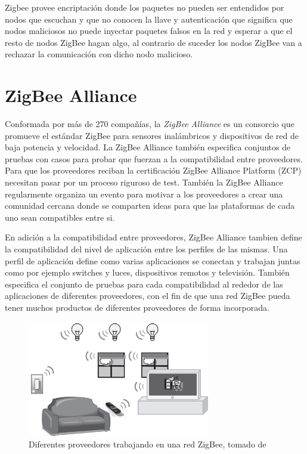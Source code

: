 \documentclass[10pt,journal,compsoc]{IEEEtran}
\begin{document}
Zigbee provee encriptación donde los paquetes no pueden ser entendidos por nodos que escuchan y que no conocen la llave y autenticación que significa que nodos maliciosos no puede inyectar paquetes falsos en la red y esperar a que el resto de nodos ZigBee hagan algo, al contrario de suceder los nodos ZigBee van a rechazar la comunicación con dicho nodo malicioso.

\section{ZigBee Alliance}
 
  Conformada por más de 270 compañías, la \emph{ZigBee Alliance} es un consorcio que promueve el estándar ZigBee para sensores inalámbricos y dispositivos de red de baja potencia y velocidad. La ZigBee Alliance también especifica conjuntos de pruebas con casos para probar que fuerzan a la compatibilidad entre proveedores. Para que los proveedores reciban la certificación ZigBee Alliance Platform (ZCP) necesitan pasar por un proceso riguroso de test. También la ZigBee Alliance regularmente organiza un evento para motivar a los proveedores a crear una comunidad cercana donde se comparten ideas para que las plataformas de cada uno sean compatibles entre si.
  
  En adición a la compatibilidad entre proveedores, ZigBee Alliance tambien define la compatibilidad del nivel de aplicación entre los perfiles de las mismas. Una perfil de aplicación define como varias aplicaciones se conectan y trabajan juntas como por ejemplo switches y luces, dispositivos remotos y televisión. También especifica el conjunto de pruebas para cada compatibilidad al rededor de las aplicaciones de diferentes proveedores, con el fin de que una red ZigBee pueda tener muchos productos de diferentes proveedores de forma incorporada.
  
  
  \begin{figure}[h]
    \centering
    \includegraphics[width=8cm]{redZigbee}
    \caption{Diferentes proveedores trabajando en una red ZigBee, tomado de \cite{gislason}}
    \label{fig:device-architecture}
\end{figure}
 
\end{document}
